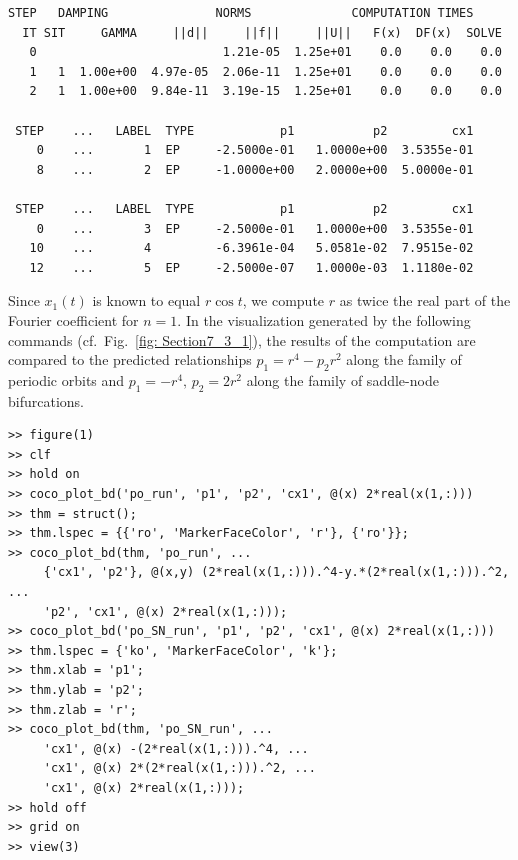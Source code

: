 \begin{lstlisting}[language=coco-highlight,frame=lines]
    STEP   DAMPING               NORMS              COMPUTATION TIMES
  IT SIT     GAMMA     ||d||     ||f||     ||U||   F(x)  DF(x)  SOLVE
   0                          1.21e-05  1.25e+01    0.0    0.0    0.0
   1   1  1.00e+00  4.97e-05  2.06e-11  1.25e+01    0.0    0.0    0.0
   2   1  1.00e+00  9.84e-11  3.19e-15  1.25e+01    0.0    0.0    0.0

 STEP    ...   LABEL  TYPE            p1           p2         cx1
    0    ...       1  EP     -2.5000e-01   1.0000e+00  3.5355e-01
    8    ...       2  EP     -1.0000e+00   2.0000e+00  5.0000e-01

 STEP    ...   LABEL  TYPE            p1           p2         cx1
    0    ...       3  EP     -2.5000e-01   1.0000e+00  3.5355e-01
   10    ...       4         -6.3961e-04   5.0581e-02  7.9515e-02
   12    ...       5  EP     -2.5000e-07   1.0000e-03  1.1180e-02
\end{lstlisting}
Since $x_1(t)$ is known to equal $r\cos{t}$, we compute $r$ as twice the real part of the Fourier coefficient for $n=1$. In the visualization generated by the following commands (cf.\ Fig.~\ref{fig: Section7_3_1}), the results of the computation are compared to the predicted relationships $p_1=r^4-p_2r^2$ along the family of periodic orbits and $p_1=-r^4,\,p_2=2r^2$ along the family of saddle-node bifurcations.
\begin{lstlisting}[language=coco-highlight,frame=lines]
>> figure(1)
>> clf
>> hold on
>> coco_plot_bd('po_run', 'p1', 'p2', 'cx1', @(x) 2*real(x(1,:)))
>> thm = struct();
>> thm.lspec = {{'ro', 'MarkerFaceColor', 'r'}, {'ro'}};
>> coco_plot_bd(thm, 'po_run', ...
     {'cx1', 'p2'}, @(x,y) (2*real(x(1,:))).^4-y.*(2*real(x(1,:))).^2, ...
     'p2', 'cx1', @(x) 2*real(x(1,:)));
>> coco_plot_bd('po_SN_run', 'p1', 'p2', 'cx1', @(x) 2*real(x(1,:)))
>> thm.lspec = {'ko', 'MarkerFaceColor', 'k'};
>> thm.xlab = 'p1';
>> thm.ylab = 'p2';
>> thm.zlab = 'r';
>> coco_plot_bd(thm, 'po_SN_run', ...
     'cx1', @(x) -(2*real(x(1,:))).^4, ...
     'cx1', @(x) 2*(2*real(x(1,:))).^2, ...
     'cx1', @(x) 2*real(x(1,:)));
>> hold off
>> grid on
>> view(3)
\end{lstlisting}
